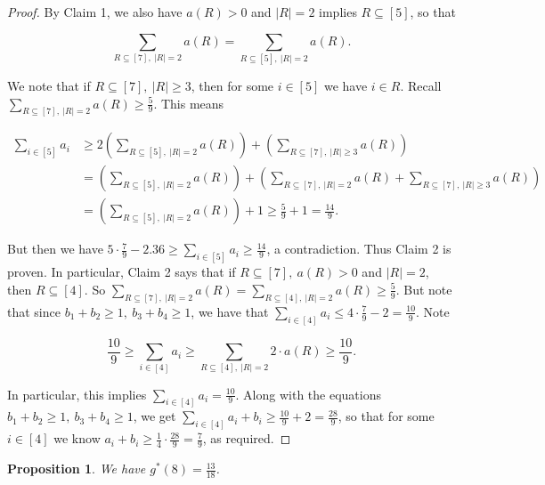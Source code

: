 \documentclass{article}
\newtheorem{proposition}{Proposition}
\begin{document}
\begin{proof}
 By Claim 1, we also have $a(R) > 0$ and $|R| = 2$ implies $R \subseteq [5]$, so that 

$$\sum_{R \subseteq [7], \ |R| = 2} a(R) = \sum_{R \subseteq [5], \ |R| = 2} a(R).$$

\noindent
We note that if $R \subseteq [7], \ |R| \geq 3$, then for some $i \in [5]$ we have $i \in R$. Recall $\sum_{R \subseteq [7], \ |R| = 2} a(R) \geq \frac{5}{9}$. This means 

\begin{align*}
\sum_{i \in [5]} a_i &\geq 2 \left( \sum_{R \subseteq [5], \ |R| = 2} a(R) \right) + \left( \sum_{R \subseteq [7], \ |R| \geq 3} a(R) \right) \\
&= \left( \sum_{R \subseteq [5], \ |R| = 2} a(R) \right) + \left( \sum_{R \subseteq [7], \ |R| = 2} a(R) + \sum_{R \subseteq [7], \ |R| \geq 3} a(R) \right) \\
&= \left( \sum_{R \subseteq [5], \ |R| = 2} a(R) \right) + 1 \geq \frac{5}{9} + 1 =\frac{14}{9}.
\end{align*}

\noindent
But then we have $5 \cdot \frac{7}{9} - 2.36 \geq \sum_{i \in [5]} a_i \geq \frac{14}{9}$, a contradiction. Thus Claim 2 is proven. In particular, Claim 2 says that if $R \subseteq [7], \ a(R) > 0$ and $|R| = 2$, then $R \subseteq [4]$. So $\sum_{R \subseteq [7], \ |R| = 2} a(R) = \sum_{R \subseteq [4], \ |R| = 2} a(R) \geq \frac{5}{9}$. But note that since $b_1 + b_2 \geq 1, \ b_3 + b_4 \geq 1$, we have that $\sum_{i \in [4]} a_i \leq 4 \cdot \frac{7}{9} - 2 = \frac{10}{9}$. Note

$$\frac{10}{9} \geq \sum_{i\in [4]} a_i \geq \sum_{R \subseteq [4], \ |R| = 2} 2 \cdot a(R) \geq \frac{10}{9}.$$

In particular, this implies $\sum_{i\in [4]} a_i = \frac{10}{9}$. Along with the equations $b_1 + b_2 \geq 1, \ b_3 + b_4 \geq 1$, we get $\sum_{i \in [4]} a_i + b_i \geq \frac{10}{9} + 2 = \frac{28}{9}$, so that for some $i \in [4]$ we know $a_i + b_i \geq \frac{1}{4} \cdot \frac{28}{9} = \frac{7}{9}$, as required. 
\end{proof}

\begin{proposition}
We have $g^*(8) = \frac{13}{18}$.
\end{proposition}
\end{document}
